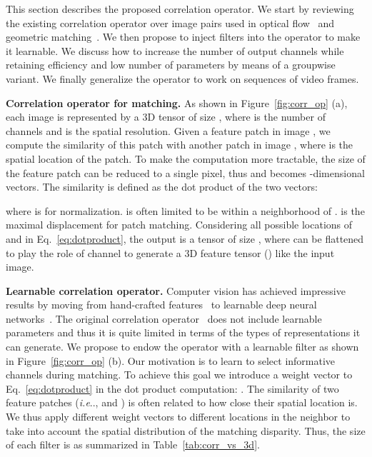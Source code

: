 \documentclass[10pt,twocolumn,letterpaper]{article}
\makeatletter
\DeclareRobustCommand\onedot{\futurelet\@let@token\@onedot}
\def\@onedot{\ifx\@let@token.\else.\null\fi\xspace}
\def\ie{\emph{i.e}\onedot} \def\Ie{\emph{I.e}\onedot}
\makeatother
\begin{document}
This section describes the proposed correlation operator. We start by reviewing the existing correlation operator over image pairs used in optical flow~\cite{FlowNet,sun2018pwc} and geometric matching~\cite{weinzaepfel2013deepflow,rocco2017convolutional}. We then propose to inject filters into the operator to make it learnable. We discuss how to increase the number of output channels while retaining efficiency and low number of parameters by means of a groupwise variant. We finally generalize the operator to work on sequences of video frames.

\noindent\textbf{Correlation operator for matching.} As shown in Figure~\ref{fig:corr_op} (a), each image is represented by a 3D tensor of size , where  is the number of channels and  is the spatial resolution. Given a feature patch  in image , we compute the similarity of this patch with another patch  in image , where  is the spatial location of the patch. To make the computation more tractable, the size of the feature patch can be reduced to a single pixel, thus  and  becomes -dimensional vectors. The similarity is defined as the dot product of the two vectors:

where  is for normalization.  is often limited to be within a  neighborhood of .  is the maximal displacement for patch matching.
Considering all possible locations of  and  in Eq.~\ref{eq:dotproduct}, the output  is a tensor of size , where  can be flattened to play the role of channel to generate a 3D feature tensor () like the input image. 

\noindent\textbf{Learnable correlation operator.} Computer vision has achieved impressive results by moving from hand-crafted features~\cite{lowe2004distinctive,dalal:inria-00548587} to learnable deep neural networks~\cite{Krizhevsky12,KaimingHe16}. 
The original correlation operator~\cite{FlowNet,sun2018pwc,weinzaepfel2013deepflow,rocco2017convolutional} does not include learnable parameters and thus it is quite limited in terms of the types of representations it can generate. We propose to endow the operator with a learnable filter as shown in Figure~\ref{fig:corr_op} (b). Our motivation is to learn to select informative channels during matching.
To achieve this goal we introduce a weight vector  to Eq.~\ref{eq:dotproduct} in the dot product computation: .
The similarity of two feature patches (\ie,  and ) is often related to how close their spatial location is. 
We thus apply different weight vectors  to different locations in the  neighbor to take into account the spatial distribution of the matching disparity. 
Thus, the size of each filter is  as summarized in Table~\ref{tab:corr_vs_3d}. 
\end{document}
